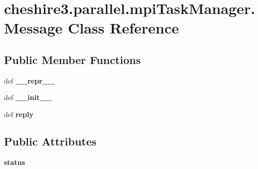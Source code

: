 \hypertarget{classcheshire3_1_1parallel_1_1mpi_task_manager_1_1_message}{\section{cheshire3.\-parallel.\-mpi\-Task\-Manager.\-Message Class Reference}
\label{classcheshire3_1_1parallel_1_1mpi_task_manager_1_1_message}
}
\subsection*{Public Member Functions}
\begin{DoxyCompactItemize}
\item 
\hypertarget{classcheshire3_1_1parallel_1_1mpi_task_manager_1_1_message_ade60175bb7d2802b533698db48885315}{def {\bfseries \-\_\-\-\_\-repr\-\_\-\-\_\-}}\label{classcheshire3_1_1parallel_1_1mpi_task_manager_1_1_message_ade60175bb7d2802b533698db48885315}

\item 
\hypertarget{classcheshire3_1_1parallel_1_1mpi_task_manager_1_1_message_a8159145aa9e9e56f7723acd593337483}{def {\bfseries \-\_\-\-\_\-init\-\_\-\-\_\-}}\label{classcheshire3_1_1parallel_1_1mpi_task_manager_1_1_message_a8159145aa9e9e56f7723acd593337483}

\item 
\hypertarget{classcheshire3_1_1parallel_1_1mpi_task_manager_1_1_message_a72313f513098d94d8bfcbea0bec8c002}{def {\bfseries reply}}\label{classcheshire3_1_1parallel_1_1mpi_task_manager_1_1_message_a72313f513098d94d8bfcbea0bec8c002}

\end{DoxyCompactItemize}
\subsection*{Public Attributes}
\begin{DoxyCompactItemize}
\item 
\hypertarget{classcheshire3_1_1parallel_1_1mpi_task_manager_1_1_message_a10a466a2dc584d92a79c7e1207a0e41b}{{\bfseries status}}\label{classcheshire3_1_1parallel_1_1mpi_task_manager_1_1_message_a10a466a2dc584d92a79c7e1207a0e41b}

\end{DoxyCompactItemize}
